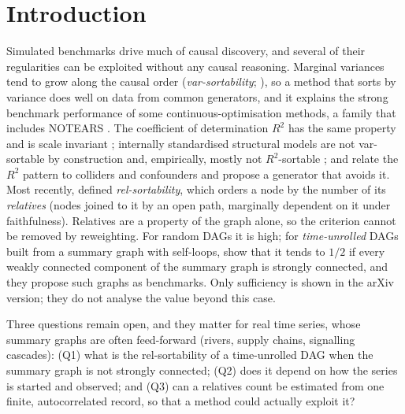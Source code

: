 \documentclass{article}
\theoremstyle{plain}
\theoremstyle{definition}
\theoremstyle{remark}
\begin{document}
\section{Introduction}
\label{sec:intro}

Simulated benchmarks drive much of causal discovery, and several of their
regularities can be exploited without any causal reasoning. Marginal variances
tend to grow along the causal order (\emph{var-sortability};
\citealp{reisach2021beware}), so a method that sorts by variance does well on
data from common generators, and it explains the strong benchmark performance of some
continuous-optimisation methods, a family that includes NOTEARS
\citep{zheng2018notears}. The
coefficient of determination $R^2$ has the same property and is scale
invariant \citep{reisach2023scale}; internally standardised structural
models are not var-sortable by construction and, empirically, mostly not
$R^2$-sortable \citep{ormaniec2025standardizing}; and \citet{herman2025unitless} relate the
$R^2$ pattern to colliders and confounders and propose a generator that avoids
it. Most recently, \citet{reisach2026topological} defined
\emph{rel-sortability}, which orders a node by the number of its
\emph{relatives} (nodes joined to it by an open path, marginally dependent on
it under faithfulness). Relatives are a property of the graph alone, so the
criterion cannot be removed by reweighting. For random DAGs it is high; for
\emph{time-unrolled} DAGs built from a summary graph with self-loops,
\citet[Thm.~4]{reisach2026topological} show that it tends to $1/2$ if every
weakly connected component of the summary graph is strongly connected, and
they propose such graphs as benchmarks. Only sufficiency is shown in the arXiv
version; they do not analyse the value beyond this case.

Three questions remain open, and they matter for real time series, whose
summary graphs are often feed-forward (rivers, supply chains, signalling
cascades): (Q1) what is the rel-sortability of a time-unrolled DAG when the
summary graph is not strongly connected; (Q2) does it depend on how the series
is started and observed; and (Q3) can a relatives count be estimated from one
finite, autocorrelated record, so that a method could actually exploit it?
\end{document}
